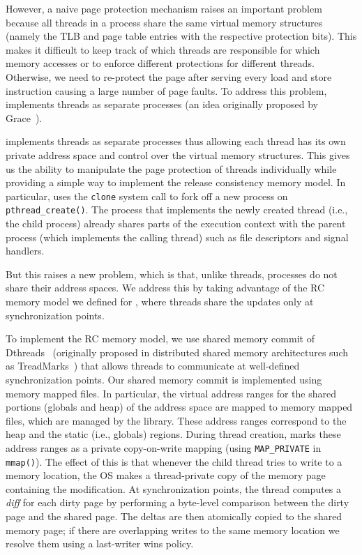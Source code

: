 However, a naive page protection mechanism raises an important problem because all threads in a process share the same virtual memory
structures (namely the TLB and page table entries with the respective protection bits). This makes it difficult to keep track of which
threads are responsible for which memory accesses or to enforce different protections for different threads. Otherwise, we need to re-protect the page after serving every load and store instruction causing a large number of page faults.
To address this problem, \projecttitle implements threads as separate
processes (an idea originally proposed by Grace~\cite{grace-oopsla-2009}).

 \projecttitle  implements threads as separate processes thus allowing each thread has its own private address space and control over the virtual
memory structures.   This gives us the ability to manipulate the page protection of threads individually while providing a simple way to implement the release consistency memory
model. In particular, \projecttitle uses the {\tt clone} system call to fork off a new process on {\tt pthread\_create()}. The process that implements the newly created thread (i.e., the child process) already
shares parts of the execution context with the parent process (which implements the calling thread) such as file descriptors and signal handlers. 


But this raises a new problem, which is that, unlike threads, processes do not share their address spaces. We address this by taking advantage of the RC memory model we defined for \projecttitle, where threads share the updates only at synchronization points.  

 To implement the RC memory model, we use shared memory commit of  Dthreads~\cite{dthreads-sosp-2011} (originally proposed in distributed shared memory architectures such as TreadMarks~\cite{treadmark})%
that allows threads to communicate at well-defined synchronization points.
Our shared memory commit is implemented using memory mapped files. In
particular, the virtual address ranges for the shared portions (globals and heap) of
the address space are mapped to memory mapped files, which are managed by the
\projecttitle library. These address ranges correspond to the heap and
the static (i.e., globals) regions.  During thread creation,
\projecttitle marks these address ranges as a private copy-on-write
mapping (using {\tt MAP\_PRIVATE} in {\tt mmap()}). The effect of this
is that whenever the child thread tries to write to a memory location,
the OS makes a thread-private copy of the memory page containing the
modification.  At synchronization points, the thread computes a {\em diff}
for each dirty page by performing a byte-level comparison between the
dirty page and the shared page. The deltas are then atomically
copied to the shared memory page; if there are overlapping writes
to the same memory location we resolve them using a last-writer wins policy.


